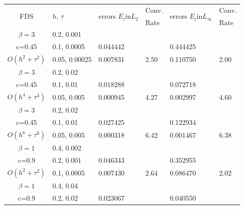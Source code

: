 \documentclass[%
 aip,
cp,  %
 amsmath,amssymb,%
 reprint,%
]{revtex4-2}
\begin{document}
\begin{table}[ht]
\centering
\small
		\begin{tabular}{||c|l|ll|ll||}
			\hline
			\hline
      \multirow{2  }{*}{FDS}        & \multirow{2  }{*}{$h$, $\tau$}  & \multirow{ 2 }{*}{errors $E_i$in$L_2$}  &Conv.& \multirow{2  }{*}{errors $E_i$in$L_\infty$}  &Conv.  \\
	                                        &                                                     &                                                                 &  Rate &                                                                       & Rate \\
   			\hline 
					\hline 
  $\beta=3$                &0.2, 0.001         &              &            &                     &      \\
   c=0.45                     &0.1, 0.0005         &0.044442  &            &0.444425 &       \\
     $O(h^2 + \tau^ 2)$ &0.05, 0.00025  & 0.007831 & 2.50      & 0.110750     & 2.00      \\
			\hline 
  $\beta=3$               &0.2, 0.02       &                &            &                     &      \\
   c=0.45                    &0.1, 0.01      &0.018288 &            &0.072718   &       \\
     $O(h^4+ \tau^4)$ &0.05, 0.005  &0.000945 &4.27    &0.002997   &4.60      \\
			\hline 
  $\beta=3$               &0.2, 0.02       &                &            &                      &            \\
     c=0.45                 &0.1, 0.01        &0.027425 &            &  0.122934    &           \\
     $O(h^6+ \tau^6)$ &0.05, 0.005 &0.000318 & 6.42     & 0.001467     &6.38   \\
	   \hline
			\hline 
       $\beta=1$       &0.4, 0.002        &             &            &           &   \\
                  c=0.9    &0.2, 0.001       &  0.046343   &            &0.352955 &   \\
  $O(h^2+ \tau^2)$ &0.1, 0.0005   &0.007430   &2.64  &0.086470  & 2.02 \\
			\hline
      $\beta=1$               &0.4, 0.04    &            &               &             &    \\
       c=0.9                     &0.2, 0.02     & 0.023067   &        &  0.040550   &   \\

\end{tabular}
\end{table}
\end{document}
